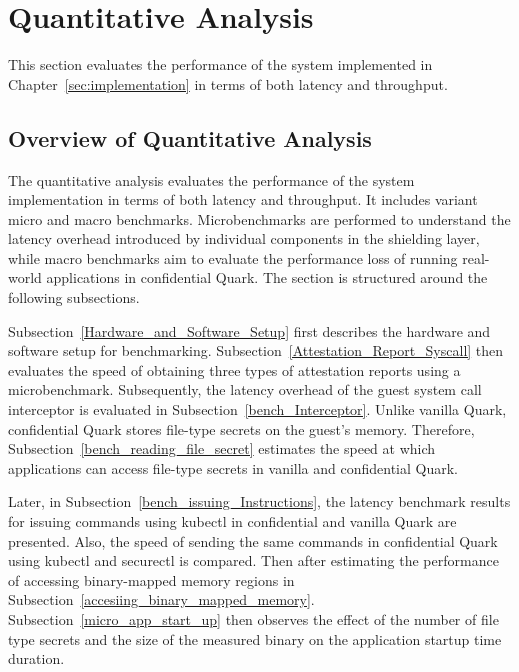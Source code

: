 





\section{Quantitative Analysis}
\label{sec:eva_Quantitative}
This section evaluates the performance of the system implemented in Chapter~\ref{sec:implementation} in terms of both latency and throughput.

\subsection{Overview of Quantitative Analysis}
\label{sec:eva_overwiwe_Quantitative}

The quantitative analysis evaluates the performance of the system implementation in terms of both latency and throughput. It includes variant micro and macro benchmarks. Microbenchmarks are performed to understand the latency overhead introduced by individual components in the shielding layer, while macro benchmarks aim to evaluate the 
performance loss of running real-world applications in confidential Quark. The section is structured around the following subsections. 

Subsection~\ref{Hardware_and_Software_Setup} first describes the hardware and software setup for benchmarking. Subsection~\ref{Attestation_Report_Syscall} then evaluates the speed of obtaining three types of attestation reports using a microbenchmark. Subsequently, the latency overhead of the guest system 
call interceptor is evaluated in Subsection~\ref{bench_Interceptor}. Unlike vanilla Quark, confidential Quark stores file-type secrets on the guest's memory. Therefore, Subsection~\ref{bench_reading_file_secret} estimates the speed at which applications can access file-type secrets in vanilla and confidential Quark.
 
Later, in Subsection~\ref{bench_issuing_Instructions}, the latency benchmark results for issuing commands using kubectl in confidential and vanilla Quark are presented. Also, the speed of sending the same commands in confidential Quark using kubectl and securectl is compared. Then after 
estimating the performance of accessing binary-mapped memory regions in Subsection~\ref{accesiing_binary_mapped_memory}. Subsection~\ref{micro_app_start_up} then observes the effect of the number of file type secrets and the size of the measured binary on the application startup time duration.


